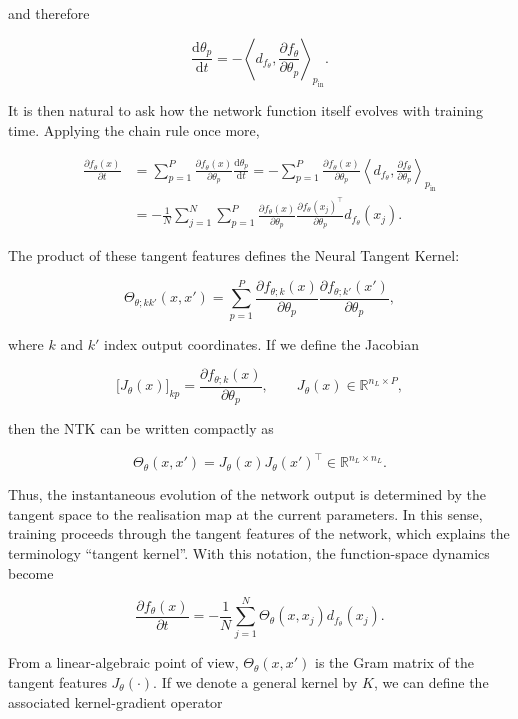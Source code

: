 and therefore

\[
\frac{\mathrm{d}\theta_p}{\mathrm{d}t}
=
-
\left\langle
d_{f_\theta},
\frac{\partial f_\theta}{\partial \theta_p}
\right\rangle_{p_{\mathrm{in}}}.
\]

It is then natural to ask how the network function itself evolves with training time. Applying the chain rule once more,

\[
\begin{aligned}
\frac{\partial f_\theta(x)}{\partial t}
&=
\sum_{p=1}^{P}
\frac{\partial f_\theta(x)}{\partial \theta_p}
\frac{\mathrm{d}\theta_p}{\mathrm{d}t} =
-
\sum_{p=1}^{P}
\frac{\partial f_\theta(x)}{\partial \theta_p}
\left\langle
d_{f_\theta},
\frac{\partial f_\theta}{\partial \theta_p}
\right\rangle_{p_{\mathrm{in}}} \\[0.5em]
&=
-
\frac{1}{N}
\sum_{j=1}^{N}
\sum_{p=1}^{P}
\frac{\partial f_\theta(x)}{\partial \theta_p}
\frac{\partial f_\theta(x_j)^{\top}}{\partial \theta_p}
d_{f_\theta}(x_j).
\end{aligned}
\]

The product of these tangent features defines the Neural Tangent Kernel:

\[
\Theta_{\theta;kk'}(x,x')
=
\sum_{p=1}^{P}
\frac{\partial f_{\theta;k}(x)}{\partial \theta_p}
\frac{\partial f_{\theta;k'}(x')}{\partial \theta_p},
\label{keyeq:ntk-definition}
\]

where \(k\) and \(k'\) index output coordinates. If we define the Jacobian

\[
\bigl[J_\theta(x)\bigr]_{kp}
=
\frac{\partial f_{\theta;k}(x)}{\partial \theta_p},
\qquad
J_\theta(x) \in \mathbb{R}^{n_L \times P},
\]

then the NTK can be written compactly as

\[
\Theta_\theta(x,x')
=
J_\theta(x)J_\theta(x')^{\top}
\in
\mathbb{R}^{n_L \times n_L}.
\]

Thus, the instantaneous evolution of the network output is determined by the tangent space to the realisation map at the current parameters. In this sense, training proceeds through the tangent features of the network, which explains the terminology ``tangent kernel''. With this notation, the function-space dynamics become

\[
\frac{\partial f_\theta(x)}{\partial t}
=
-
\frac{1}{N}
\sum_{j=1}^{N}
\Theta_\theta(x,x_j)
d_{f_\theta}(x_j).
\]

From a linear-algebraic point of view, \(\Theta_\theta(x,x')\) is the Gram matrix of the tangent features \(J_\theta(\cdot)\). If we denote a general kernel by \(K\), we can define the associated kernel-gradient operator

